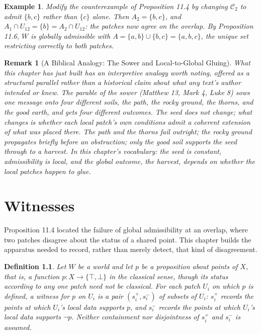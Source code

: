 \documentclass[11pt]{book}
\newtheorem{definition}[theorem]{Definition}
\newtheorem{example}[theorem]{Example}
\newtheorem*{appendixremark}{Remark}
\begin{document}
\begin{example}
Modify the counterexample of Proposition 11.4 by changing $\mathcal C_2$ to admit $\{b,c\}$ rather than $\{c\}$ alone. Then $A_2 = \{b,c\}$, and $A_1 \cap U_{12} = \{b\} = A_2 \cap U_{12}$: the patches now agree on the overlap. By Proposition 11.6, $W$ is globally admissible with $A = \{a,b\} \cup \{b,c\} = \{a,b,c\}$, the unique set restricting correctly to both patches.
\end{example}

\begin{appendixremark}[A Biblical Analogy: The Sower and Local-to-Global Gluing]
What this chapter has just built has an interpretive analogy worth noting, offered as a structural parallel rather than a historical claim about what any text's author intended or knew. The parable of the sower (Matthew 13, Mark 4, Luke 8) sows one message onto four different soils, the path, the rocky ground, the thorns, and the good earth, and gets four different outcomes. The seed does not change; what changes is whether each local patch's own conditions admit a coherent extension of what was placed there. The path and the thorns fail outright; the rocky ground propagates briefly before an obstruction; only the good soil supports the seed through to a harvest. In this chapter's vocabulary: the seed is constant, admissibility is local, and the global outcome, the harvest, depends on whether the local patches happen to glue.
\end{appendixremark}

\chapter{Witnesses}

Proposition 11.4 located the failure of global admissibility at an overlap, where two patches disagree about the status of a shared point. This chapter builds the apparatus needed to record, rather than merely detect, that kind of disagreement.

\begin{definition}
Let $W$ be a world and let $p$ be a proposition about points of $X$, that is, a function $p : X \to \{\top, \bot\}$ in the classical sense, though its status according to any one patch need not be classical. For each patch $U_i$ on which $p$ is defined, a \emph{witness} for $p$ on $U_i$ is a pair $(s_i^+, s_i^-)$ of subsets of $U_i$: $s_i^+$ records the points at which $U_i$'s local data supports $p$, and $s_i^-$ records the points at which $U_i$'s local data supports $\neg p$. Neither containment nor disjointness of $s_i^+$ and $s_i^-$ is assumed.
\end{definition}
\end{document}

